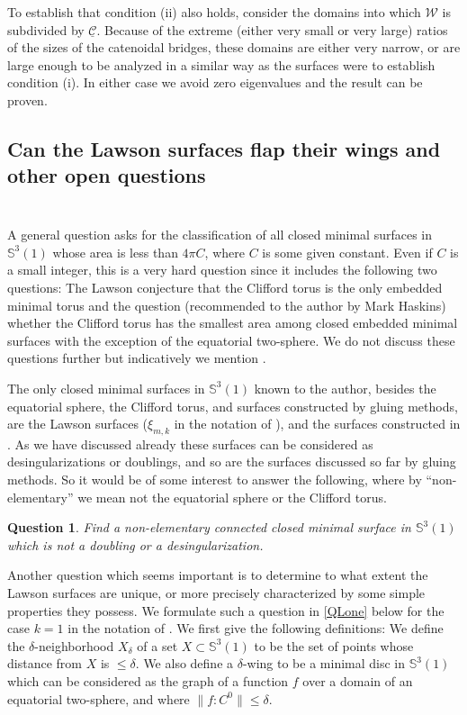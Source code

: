 \documentclass[12pt,namelimits,sumlimits]{amsart}
\newtheorem{question}[theorem]{Question}
\theoremstyle{remark}
\numberwithin{equation}{section}
\begin{document}
To establish that condition (ii) also holds,
consider the domains into which ${{\mathcal{W}}}$ is subdivided by ${\underline{{\mathcal{C}}}}$.
Because of the extreme (either very small or very large) ratios of the sizes of the catenoidal bridges,
these domains are either very narrow, or are large enough to be analyzed
in a similar way as the surfaces were to establish condition (i).
In either case we avoid zero eigenvalues and the result can be proven.

\subsection*{Can the Lawson surfaces flap their wings and other open questions}
$\phantom{ab}$
\nopagebreak

A general question asks for the classification of all closed minimal surfaces in ${\mathbb{S}}^3(1)$
whose area is less than $4\pi C$, where $C$ is some given constant.
Even if $C$ is a small integer, 
this is a very hard question since it includes the following two questions:
The Lawson conjecture that the Clifford torus is the only embedded minimal torus and
the question (recommended to the author by Mark Haskins)
whether the Clifford torus has the smallest area
among closed embedded minimal surfaces with the exception of the equatorial two-sphere.
We do not discuss these questions further but indicatively we mention \cite{ros:lc,ros:area,white}.

The only closed minimal surfaces in ${\mathbb{S}}^3(1)$ known to the author,
besides the equatorial sphere, the Clifford torus, and surfaces constructed by gluing methods,
are the Lawson surfaces ($\xi_{m,k}$ in the notation of \cite{L2}),
and the surfaces constructed in \cite{KPS}.
As we have discussed already these surfaces can be considered as desingularizations or doublings,
and so are the surfaces discussed so far by gluing methods.
So it would be of some interest to answer the following,
where by ``non-elementary'' we mean not the equatorial sphere or the Clifford torus.

\addtocounter{equation}{1}
\begin{question}
\label{Qdifferent}
Find a non-elementary connected closed minimal surface in ${\mathbb{S}}^3(1)$ which is not a doubling or a desingularization.
\end{question}

Another question which seems important is to determine 
to what extent the Lawson surfaces are unique,
or more precisely characterized by some simple properties they possess.
We formulate such a question in \ref{QLone} below for the case $k=1$ in the notation of \cite{L2}.
We first give the following definitions:
We define the $\delta$-neighborhood $X_\delta$ of a set $X\subset{\mathbb{S}}^3(1)$
to be the set of points whose distance from $X$ is $\le\delta$.
We also define a $\delta$-wing to be a minimal disc in ${\mathbb{S}}^3(1)$
which can be considered as the graph of a function $f$ over a domain of an equatorial two-sphere,
and where $\|f:C^0\|\le\delta$.
\end{document}
